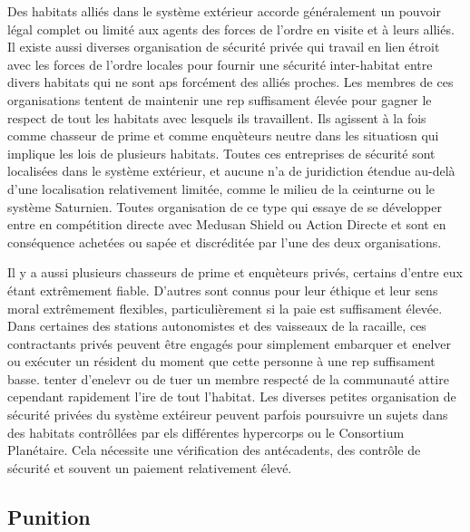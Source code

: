 Des habitats alliés dans le système extérieur accorde généralement un pouvoir légal complet ou limité aux agents des forces de l'ordre en visite et à leurs alliés. Il existe aussi diverses organisation de sécurité privée qui travail en lien étroit avec les forces de l'ordre locales pour fournir une sécurité inter-habitat entre divers habitats qui ne sont aps forcément des alliés proches. Les membres de ces organisations tentent de maintenir une rep suffisament élevée pour gagner le respect de tout les habitats avec lesquels ils travaillent. Ils agissent à la fois comme chasseur de prime et comme enquèteurs neutre dans les situatiosn qui implique les lois de plusieurs habitats. Toutes ces entreprises de sécurité sont localisées dans le système extérieur, et aucune n'a de juridiction étendue au-delà d'une localisation relativement limitée, comme le milieu de la ceinturne ou le système Saturnien. Toutes organisation de ce type qui essaye de se développer entre en compétition directe avec Medusan Shield ou Action Directe et sont en conséquence achetées ou sapée et discréditée par l'une des deux organisations. 

Il y a aussi plusieurs chasseurs de prime et enquèteurs privés, certains d'entre eux étant extrêmement fiable. D'autres sont connus pour leur éthique et leur sens moral extrêmement flexibles, particulièrement si la paie est suffisament élevée. Dans certaines des stations autonomistes et des vaisseaux de la racaille, ces contractants privés peuvent être engagés pour simplement embarquer et enelver ou exécuter un résident du moment que cette personne à une rep suffisament basse. tenter d'enelevr ou de tuer un membre respecté de la communauté attire cependant rapidement l'ire de tout l'habitat. Les diverses petites organisation de sécurité privées du système extéireur peuvent parfois poursuivre un sujets dans des habitats contrôllées par els différentes hypercorps ou le Consortium Planétaire. Cela nécessite une vérification des antécadents, des contrôle de sécurité et souvent un paiement relativement élevé. 

\subsection{Punition} \label{sec:punishment} 

